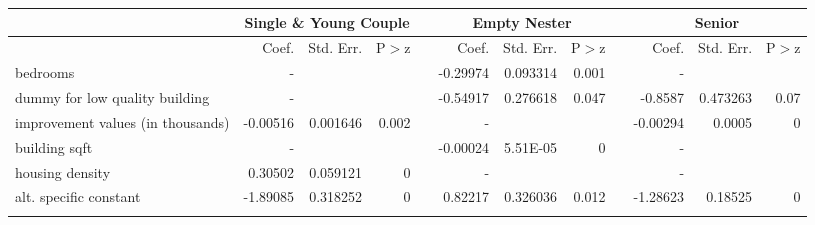 \begin{tabular}{p{1in}rrrrrrrrrrr}

           & \multicolumn{ 3}{c}{Single \& Young Couple} &            &    \multicolumn{ 3}{c}{Empty Nester} &            &          \multicolumn{ 3}{c}{Senior} \\
\hline
           &      Coef. &  Std. Err. &        P$>$z &            &      Coef. &  Std. Err. &        P$>$z &            &      Coef. &  Std. Err. &        P$>$z \\
\hline
  bedrooms &          - &            &            &            &   -0.29974 &   0.093314 &      0.001 &            &          - &            &            \\

dummy for low quality building &          - &            &            &            &   -0.54917 &   0.276618 &      0.047 &            &    -0.8587 &   0.473263 &       0.07 \\

improvement values (in thousands) &   -0.00516 &   0.001646 &      0.002 &            &          - &            &            &            &   -0.00294 &     0.0005 &          0 \\

building sqft &          - &            &            &            &   -0.00024 &   5.51E-05 &          0 &            &          - &            &            \\

housing density &    0.30502 &   0.059121 &          0 &            &          - &            &            &            &          - &            &            \\

alt. specific constant &   -1.89085 &   0.318252 &          0 &            &    0.82217 &   0.326036 &      0.012 &            &   -1.28623 &    0.18525 &          0 \\

           &            &            &            &            &            &            &            &            &            &            &            \\
\hline
\end{tabular}  

